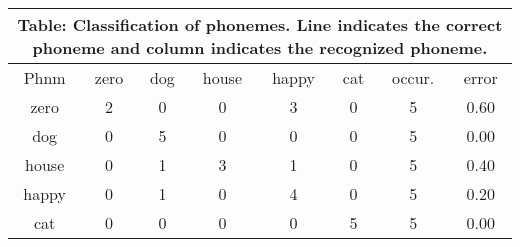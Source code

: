 \documentclass[10pt]{article}
\begin{document}
\tiny
\begin{tabular}{|@{}c@{}||@{}c@{}|@{}c@{}|@{}c@{}|@{}c@{}|@{}c@{}|@{}c@{}|@{}c@{}|}
\hline
\multicolumn{8}{c}{Table: Classification of phonemes. Line indicates the correct phoneme and column indicates the recognized phoneme.} \\ \hline \hline
Phnm & zero & dog & house & happy & cat & occur. & error \\ \hline
zero & 2 & 0 & 0 & 3 & 0 & 5 & 0.60 \\ \hline
dog & 0 & 5 & 0 & 0 & 0 & 5 & 0.00 \\ \hline
house & 0 & 1 & 3 & 1 & 0 & 5 & 0.40 \\ \hline
happy & 0 & 1 & 0 & 4 & 0 & 5 & 0.20 \\ \hline
cat & 0 & 0 & 0 & 0 & 5 & 5 & 0.00 \\ \hline
\end{tabular}
\end{document}
